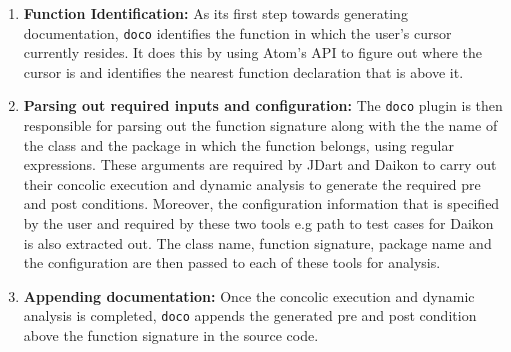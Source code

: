 \begin{enumerate}
    \item \textbf{Function Identification:} As its first step towards generating documentation, \texttt{doco} identifies the function in which the user's cursor currently resides. It does this by using Atom's API to figure out where the cursor is and identifies the nearest function declaration that is above it.
    
    \item \textbf{Parsing out required inputs and configuration:} The \texttt{doco} plugin is then responsible for parsing out the function signature along with the the name of the class and the package in which the function belongs, using regular expressions. These arguments are required by JDart and Daikon to carry out their concolic execution and dynamic analysis to generate the required pre and post conditions. Moreover, the configuration information that is specified by the user and  required by these two tools e.g path to test cases for Daikon is also extracted out. The class name, function signature, package name and the configuration are then passed to each of these tools for analysis.
    
    \item \textbf{Appending documentation:} Once the concolic execution and dynamic analysis is completed, \texttt{doco} appends the generated pre and post condition above the function signature in the source code.
\end{enumerate}
